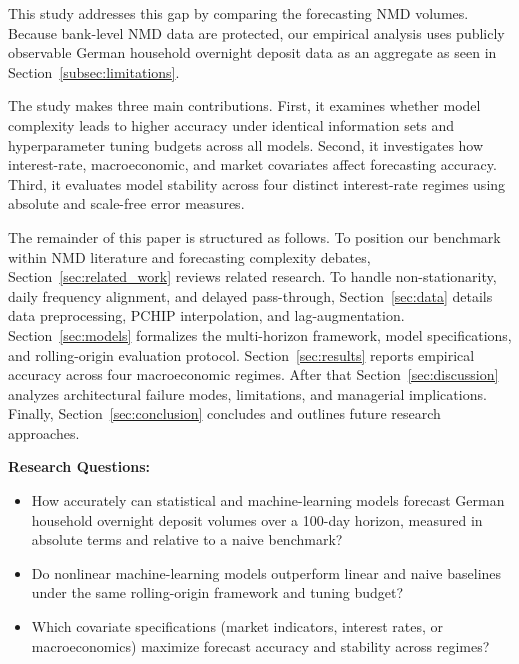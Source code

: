 \documentclass[11pt,a4paper]{article}
\begin{document}
\indent This study addresses this gap by comparing the forecasting NMD volumes. Because bank-level NMD data are
protected, our empirical analysis uses publicly observable German household
overnight deposit data as an aggregate as seen in Section~\ref{subsec:limitations}.

The study makes three main contributions. First, it examines whether model
complexity leads to higher accuracy under identical
information sets and hyperparameter tuning budgets across all models. Second, it
investigates how interest-rate, macroeconomic, and market covariates affect
forecasting accuracy. Third, it evaluates model stability across four
distinct interest-rate regimes using absolute and scale-free error measures.

\indent The remainder of this paper is structured as follows. To position our
benchmark within NMD literature and forecasting complexity debates,
Section~\ref{sec:related_work} reviews related research. To handle
non-stationarity, daily frequency alignment, and delayed pass-through,
Section~\ref{sec:data} details data preprocessing, PCHIP interpolation, and
lag-augmentation. Section~\ref{sec:models}
formalizes the multi-horizon framework, model specifications, and
rolling-origin evaluation protocol. Section~\ref{sec:results} reports
empirical accuracy across four macroeconomic regimes.
After that Section~\ref{sec:discussion} analyzes architectural failure modes,
limitations, and managerial implications. Finally, Section~\ref{sec:conclusion}
concludes and outlines future research approaches.

\begin{researchquestion}
\textbf{Research Questions:}
\begin{itemize}
    \item[\textbf{RQ1}] How accurately can statistical and machine-learning
    models forecast German household overnight deposit volumes over a 100-day
    horizon, measured in absolute terms and relative to a naive benchmark?
    \item[\textbf{RQ2}] Do nonlinear machine-learning models outperform linear
    and naive baselines under the same rolling-origin framework and tuning
    budget?
    \item[\textbf{RQ3}] Which covariate specifications (market indicators,
    interest rates, or macroeconomics) maximize forecast accuracy and stability
    across regimes?
\end{itemize}
\end{researchquestion}
\end{document}
